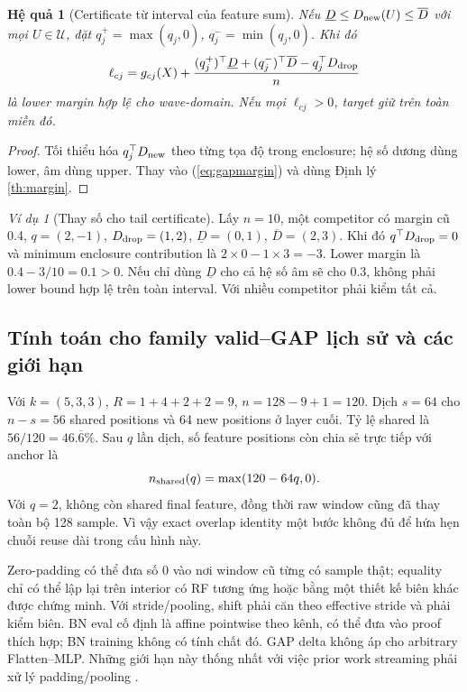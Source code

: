 \documentclass[11pt,a4paper]{article}
\newcommand{\Uset}{\mathcal U}
\newtheorem{corollary}[definition]{Hệ quả}
\theoremstyle{remark}
\newtheorem{example}[definition]{Ví dụ}
\begin{document}
\begin{corollary}[Certificate từ interval của feature sum]\label{cor:interval}
Nếu $\underline D\le D_{\rm new}(U)\le\overline D$ với mọi
$U\in\Uset$, đặt $q_j^+=\max(q_j,0)$, $q_j^-=\min(q_j,0)$. Khi đó
\begin{equation}
 \ell_{cj}=g_{cj}(X)+\frac{(q_j^+)^\top\underline D
 +(q_j^-)^\top\overline D-q_j^\top D_{\rm drop}}n
 \label{eq:tail-cert}
\end{equation}
là lower margin hợp lệ cho wave-domain. Nếu mọi $\ell_{cj}>0$, target giữ
trên toàn miền đó.
\end{corollary}
\begin{proof}
Tối thiểu hóa $q_j^\top D_{\rm new}$ theo từng tọa độ trong enclosure;
hệ số dương dùng lower, âm dùng upper. Thay vào (\ref{eq:gapmargin}) và
dùng Định lý \ref{th:margin}.
\end{proof}

\begin{example}[Thay số cho tail certificate]
Lấy $n=10$, một competitor có margin cũ 0.4, $q=(2,-1)$,
$D_{\rm drop}=(1,2)$, $\underline D=(0,1)$, $\overline D=(2,3)$.
Khi đó $q^\top D_{\rm drop}=0$ và minimum enclosure contribution là
$2\times0-1\times3=-3$. Lower margin là $0.4-3/10=0.1>0$.
Nếu chỉ dùng $\underline D$ cho cả hệ số âm sẽ cho $0.3$, không phải lower
bound hợp lệ trên toàn interval. Với nhiều competitor phải kiểm tất cả.
\end{example}

\subsection{Tính toán cho family valid--GAP lịch sử và các giới hạn}
Với $k=(5,3,3)$, $R=1+4+2+2=9$, $n=128-9+1=120$.
Dịch $s=64$ cho $n-s=56$ shared positions và 64 new positions ở layer
cuối. Tỷ lệ shared là $56/120=46.\overline6\%$. Sau $q$ lần dịch, số
feature positions còn chia sẻ trực tiếp với anchor là
\begin{equation}
 n_{\rm shared}(q)=\max(120-64q,0).
\end{equation}
Với $q=2$, không còn shared final feature, đồng thời raw window cũng đã
thay toàn bộ 128 sample. Vì vậy exact overlap identity một bước không đủ
để hứa hẹn chuỗi reuse dài trong cấu hình này.

Zero-padding có thể đưa số 0 vào nơi window cũ từng có sample thật; equality
chỉ có thể lập lại trên interior có RF tương ứng hoặc bằng một thiết kế
biên khác được chứng minh. Với stride/pooling, shift phải căn theo effective
stride và phải kiểm biên. BN eval cố định là affine pointwise theo kênh,
có thể đưa vào proof thích hợp; BN training không có tính chất đó. GAP
delta không áp cho arbitrary Flatten--MLP. Những giới hạn này thống nhất
với việc prior work streaming phải xử lý padding/pooling \cite{streaminnc}.
\end{document}
